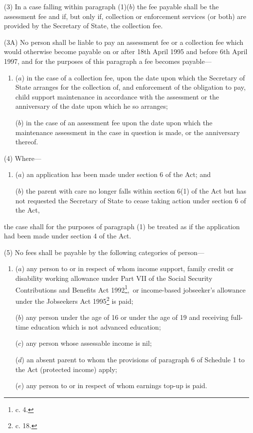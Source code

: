 \documentclass[a4paper]{article}
\begin{document}

(3) In a case falling within paragraph (1)($b$) the fee payable shall be the assessment fee and if, but only if, collection or enforcement services (or both) are provided by the Secretary of State, the collection fee.

(3A) No person shall be liable to pay an assessment fee or a collection fee which would otherwise become payable on or after 18th April 1995 and before 6th April 1997, and for the purposes of this paragraph a fee becomes payable—
\begin{enumerate}\item[]
($a$) in the case of a collection fee, upon the date upon which the Secretary of State arranges for the collection of, and enforcement of the obligation to pay, child support maintenance in accordance with the assessment or the anniversary of the date upon which he so arranges;

($b$) in the case of an assessment fee upon the date upon which the maintenance assessment in the case in question is made, or the anniversary thereof.
\end{enumerate}

(4) Where—
\begin{enumerate}\item[]
($a$) an application has been made under section 6 of the Act; and

($b$) the parent with care no longer falls within section 6(1) of the Act but has not requested the Secretary of State to cease taking action under section 6 of the Act,
\end{enumerate}
the case shall for the purposes of paragraph (1) be treated as if the application had been made under section 4 of the Act.

(5) No fees shall be payable by the following categories of person—
\begin{enumerate}\item[]
($a$) any person to or in respect of whom income support, family credit or disability working allowance under Part VII of the Social Security Contributions and Benefits Act 1992\footnote{ c. 4.},~or income-based jobseeker’s allowance under the Jobseekers Act 1995\footnote{ c. 18.} is paid;

($b$) any person under the age of 16 or under the age of 19 and receiving full-time education which is not advanced education;

($c$) any person whose assessable income is nil;

($d$) an absent parent to whom the provisions of paragraph 6 of Schedule 1 to the Act (protected income) apply;

($e$) any person to or in respect of whom earnings top-up is paid.
\end{enumerate}
\end{document}
